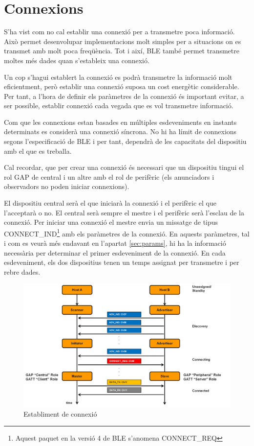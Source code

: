 \section{Connexions}
S'ha vist com no cal establir una connexió per a transmetre poca informació.
Això permet desenvolupar implementacions molt simples per a situacions on es transmet amb molt poca freqüència. Tot i així, BLE també permet transmetre moltes més dades quan s'estableix una connexió.

Un cop s'hagui establert la connexió es podrà transmetre la informació molt eficientment, però establir una connexió suposa un cost energètic considerable.
Per tant, a l'hora de definir els paràmetres de la connexió és important evitar, a ser possible, establir connexió cada vegada que es vol transmetre informació.

Com que les connexions estan basades en múltiples esdeveniments en instants determinats es considerà una connexió síncrona.
No hi ha límit de connexions segons l'especificació de BLE i per tant, dependrà de les capacitats del dispositiu amb el que es treballa.

Cal recordar, que per crear una connexió és necessari que un dispositiu tingui el rol GAP de central i un altre amb el rol de perifèric (els anunciadors i observadors no poden iniciar connexions).

El dispositiu central serà el que iniciarà la connexió i el perifèric el que l'acceptarà o no.
El central serà sempre el mestre i el perifèric serà l'esclau de la connexió.
Per iniciar una connexió el mestre envia un missatge de tipus CONNECT\_IND\footnote{Aquest paquet en la versió 4 de BLE s'anomena CONNECT\_REQ} amb els paràmetres de la connexió.
En aquests paràmetres, tal i com es veurà més endavant en l'apartat \ref{sec:params}, hi ha la informació necessària per determinar el primer esdeveniment de la connexió.
En cada esdeveniment, els dos dispositius tenen un temps assignat per transmetre i per rebre dades.

\begin{figure}[h]
	\begin{center}
		\includegraphics[width=1\textwidth]{./images/rols_unicast.png}
		\caption{Establiment de connexió}
		\label{fig:unicast_roles}
	\end{center}
\end{figure}


